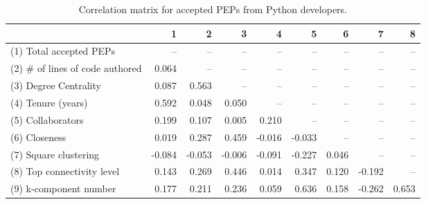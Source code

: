 \begin{table}[H]
\caption{Correlation matrix for accepted PEPs from Python developers.}
\label{corr_table_zinfl}
\begin{center}
\begin{small}
\begin{tabular}{lrrrrrrrr}
\toprule
{} &      1 &      2 &      3 &      4 &      5 &     6 &      7 &     8 \\
\midrule
(1) Total accepted PEPs         &    -- &    -- &    -- &    -- &    -- &   -- &    -- &   -- \\
(2) \# of lines of code authored &  0.064 &    -- &    -- &    -- &    -- &   -- &    -- &   -- \\
(3) Degree Centrality           &  0.087 &  0.563 &    -- &    -- &    -- &   -- &    -- &   -- \\
(4) Tenure (years)              &  0.592 &  0.048 &  0.050 &    -- &    -- &   -- &    -- &   -- \\
(5) Collaborators               &  0.199 &  0.107 &  0.005 &  0.210 &    -- &   -- &    -- &   -- \\
(6) Closeness                   &  0.019 &  0.287 &  0.459 & -0.016 & -0.033 &   -- &    -- &   -- \\
(7) Square clustering           & -0.084 & -0.053 & -0.006 & -0.091 & -0.227 & 0.046 &    -- &   -- \\
(8) Top connectivity level      &  0.143 &  0.269 &  0.446 &  0.014 &  0.347 & 0.120 & -0.192 &   -- \\
(9) k-component number          &  0.177 &  0.211 &  0.236 &  0.059 &  0.636 & 0.158 & -0.262 & 0.653 \\
\bottomrule
\end{tabular}
\end{small} 
\end{center} 
\end{table}
